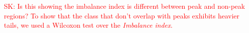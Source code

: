 \documentclass{bmcart}
\newcommand{\SK}[1]{\textcolor{red}{SK: #1}}
\begin{document}


\SK{Is this showing the imbalance index is different between peak and
  non-peak regions?  To show that the class that don't overlap with
  peaks exhibits heavier tails, we used a Wilcoxon test over the
  \emph{Imbalance index}.}


\color{black}






\end{document}
